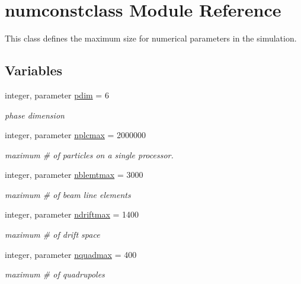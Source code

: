 \hypertarget{namespacenumconstclass}{}\section{numconstclass Module Reference}
\label{namespacenumconstclass}


This class defines the maximum size for numerical parameters in the simulation.  


\subsection*{Variables}
\begin{DoxyCompactItemize}
\item 
integer, parameter \mbox{\hyperlink{namespacenumconstclass_a24da80ebccca40a65c454aff1bd28e7f}{pdim}} = 6
\begin{DoxyCompactList}\small\item\em phase dimension \end{DoxyCompactList}\item 
integer, parameter \mbox{\hyperlink{namespacenumconstclass_a6bb8beba48502784bfcd08114a616b9b}{nplcmax}} = 2000000
\begin{DoxyCompactList}\small\item\em maximum \# of particles on a single processor. \end{DoxyCompactList}\item 
integer, parameter \mbox{\hyperlink{namespacenumconstclass_a83ab51ec1dd55c167600999fca072524}{nblemtmax}} = 3000
\begin{DoxyCompactList}\small\item\em maximum \# of beam line elements \end{DoxyCompactList}\item 
integer, parameter \mbox{\hyperlink{namespacenumconstclass_a22030f070a90c877bef951b411dac428}{ndriftmax}} = 1400
\begin{DoxyCompactList}\small\item\em maximum \# of drift space \end{DoxyCompactList}\item 
integer, parameter \mbox{\hyperlink{namespacenumconstclass_a93ef59ed830442249dee14d677ddeb08}{nquadmax}} = 400
\begin{DoxyCompactList}\small\item\em maximum \# of quadrupoles \end{DoxyCompactList}\item 

\end{DoxyCompactItemize}
